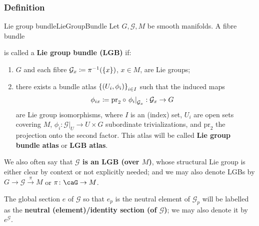 \documentclass[reqno,a4paper,oneside]{amsart}
\theoremstyle{plain}
\theoremstyle{remark}
\theoremstyle{definition}
\begin{document}
\subsubsection{Definition}
\begin{definitions}{Lie group bundle}{LieGroupBundle}
Let $G, \mathcal{G}, M$ be smooth manifolds. A fibre bundle
\begin{center}
\end{center}
is called a \textbf{Lie group bundle (LGB)} if:
\begin{enumerate}
	\item $G$ and each fibre $\mathcal{G}_x \coloneqq \pi^{-1}\mleft( \{x\} \mright)$, $x\in M$, are Lie groups;
	\item there exists a bundle atlas $\mleft\{ \mleft( U_i, \phi_i \mright) \mright\}_{i \in I}$ such that the induced maps
	\begin{align*}
	\phi_{ix}
	&\coloneqq
	\mathrm{pr}_2 \circ \mleft. \phi_i\mright|_{\mathcal{G}_x}: \mathcal{G}_x \to G
	\end{align*}
	are Lie group isomorphisms, where $I$ is an (index) set, $U_i$ are open sets covering $M$, $\phi_i: \mathcal{G}|_U \to U \times G$ subordinate trivializations, and $\mathrm{pr}_2$ the projection onto the second factor. This atlas will be called \textbf{Lie group bundle atlas} or \textbf{LGB atlas}.
\end{enumerate}

We also often say that \textbf{$\mathcal{G}$ is an LGB (over $M$)}, whose structural Lie group is either clear by context or not explicitly needed; and we may also denote LGBs by $G \to \mathcal{G} \stackrel{\pi}{\to} M$ or $\pi \colon \caG \to M$.

The global section $e$ of $\mathcal{G}$ so that $e_p$ is the neutral element of $\mathcal{G}_p$ will be labelled as the \textbf{neutral (element)/identity section (of $\mathcal{G}$)}; we may also denote it by $e^{\mathcal{G}}$.
\end{definitions}
\end{document}
